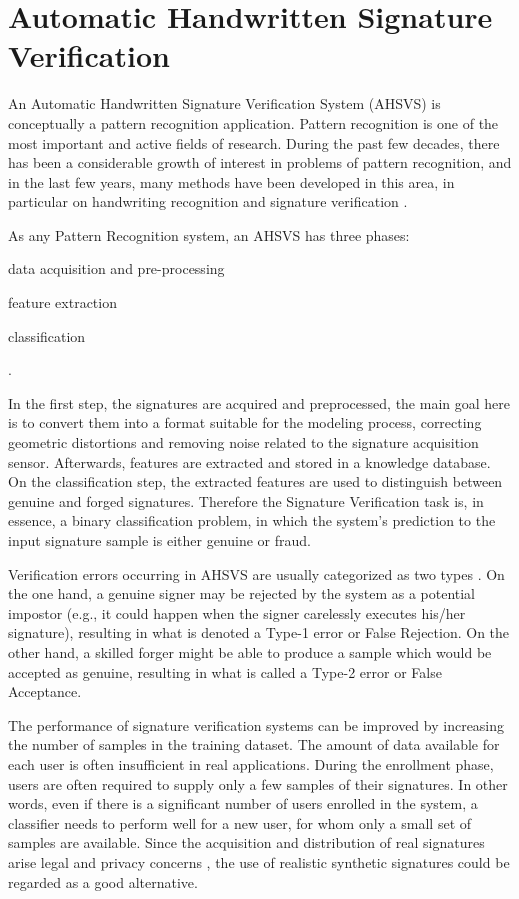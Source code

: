 \section{Automatic Handwritten Signature Verification}
An Automatic Handwritten Signature Verification System (AHSVS) is conceptually a pattern recognition application. Pattern recognition is one of the most important and active fields of research. During the past few decades, there has been a considerable growth of interest in problems of pattern recognition, and in the last few years, many methods have been developed in this area, in particular on handwriting recognition and signature verification \cite{book}. 

As any Pattern Recognition system, an AHSVS has three phases:
\begin{inlinelist}
\item data acquisition and pre-processing
\item feature extraction
\item classification
\end{inlinelist} \cite{impedovo2008state}.

In the first step, the signatures are acquired and preprocessed, the main goal here is to convert them into a format suitable for the modeling process, correcting geometric distortions and removing noise related to the signature acquisition sensor. Afterwards, features are extracted and stored in a knowledge database.  On the classification step, the extracted features are used to distinguish between genuine and forged signatures. Therefore the Signature Verification task is, in essence, a binary classification problem, in which the system's prediction to the input signature sample is either genuine or fraud.

Verification errors occurring in AHSVS are usually categorized as two types \cite{fairhurst1997signature}. On the one hand, a genuine signer may be rejected by the system as a potential impostor (e.g., it could happen when the signer carelessly executes his/her signature), resulting in what is denoted a Type-1 error or False
Rejection. On the other hand, a skilled forger might be able to produce a sample which would be accepted as genuine, resulting in what is called a Type-2 error or False Acceptance. 

The performance of signature verification systems can be improved by increasing the number of samples in the training dataset. The amount of data available for each user is often insufficient in real applications. During the enrollment phase,
users are often required to supply only a few samples of their signatures. In other words, even if there is a significant number of users enrolled in the system, a classifier needs to perform well for a new user, for whom only a small set of samples are available. Since the acquisition and distribution of real signatures arise legal and privacy concerns \cite{diaz2014generation}, the use of realistic synthetic signatures could be
regarded as a good alternative. 

